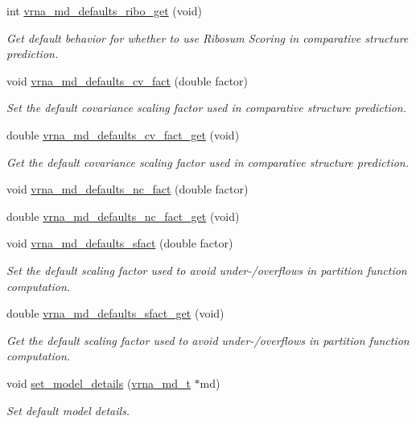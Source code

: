 \begin{DoxyCompactItemize}
int \hyperlink{group__model__details_ga169027f0c0561ea7d87b655e4b336bfc}{vrna\+\_\+md\+\_\+defaults\+\_\+ribo\+\_\+get} (void)
\begin{DoxyCompactList}\small\item\em Get default behavior for whether to use Ribosum Scoring in comparative structure prediction. \end{DoxyCompactList}\item 
void \hyperlink{group__model__details_gad3a3f40baafd91a6ce80a91a68e20053}{vrna\+\_\+md\+\_\+defaults\+\_\+cv\+\_\+fact} (double factor)
\begin{DoxyCompactList}\small\item\em Set the default covariance scaling factor used in comparative structure prediction. \end{DoxyCompactList}\item 
double \hyperlink{group__model__details_gae59c68393807217b0a2497adb64d3ee3}{vrna\+\_\+md\+\_\+defaults\+\_\+cv\+\_\+fact\+\_\+get} (void)
\begin{DoxyCompactList}\small\item\em Get the default covariance scaling factor used in comparative structure prediction. \end{DoxyCompactList}\item 
void \hyperlink{group__model__details_gac35e596c850dce3ad55c49119fd7d471}{vrna\+\_\+md\+\_\+defaults\+\_\+nc\+\_\+fact} (double factor)
\item 
double \hyperlink{group__model__details_ga7ac759eaa7159bf5f022745f5da59508}{vrna\+\_\+md\+\_\+defaults\+\_\+nc\+\_\+fact\+\_\+get} (void)
\item 
void \hyperlink{group__model__details_ga3f73d3029d3d0025d4cc311510cd95a3}{vrna\+\_\+md\+\_\+defaults\+\_\+sfact} (double factor)
\begin{DoxyCompactList}\small\item\em Set the default scaling factor used to avoid under-\//overflows in partition function computation. \end{DoxyCompactList}\item 
double \hyperlink{group__model__details_gab2df6aab954b63fd3592d18e90285dae}{vrna\+\_\+md\+\_\+defaults\+\_\+sfact\+\_\+get} (void)
\begin{DoxyCompactList}\small\item\em Get the default scaling factor used to avoid under-\//overflows in partition function computation. \end{DoxyCompactList}\item 
void \hyperlink{group__model__details_gabad896c3650d420f3f3ddefc69e2bceb}{set\+\_\+model\+\_\+details} (\hyperlink{group__model__details_ga1f8a10e12a0a1915f2a4eff0b28ea17c}{vrna\+\_\+md\+\_\+t} $\ast$md)
\begin{DoxyCompactList}\small\item\em Set default model details. \end{DoxyCompactList}\end{DoxyCompactItemize}
